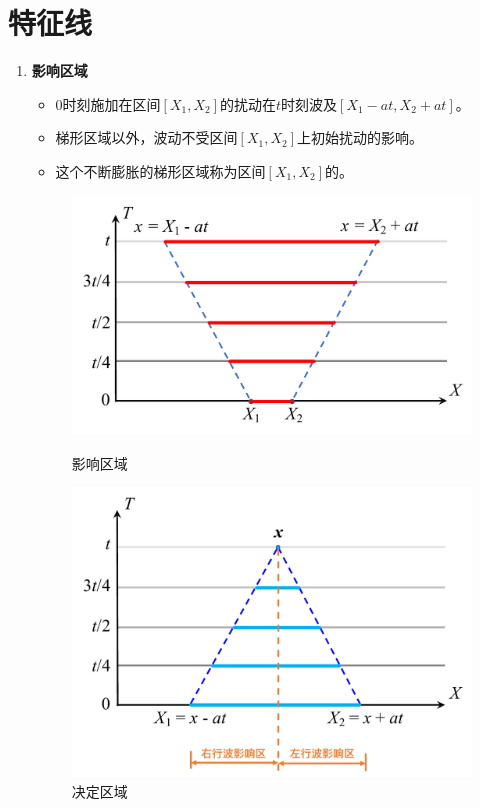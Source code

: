 \section{特征线}
\begin{enumerate}[1. ]
	\item \textbf{影响区域}
		\begin{itemize}
			\item 0时刻施加在区间$[X_1,X_2]$的扰动在$t$时刻波及$[X_1-at, X_2+at]$。
			\item 梯形区域以外，波动不受区间$[X_1,X_2]$上初始扰动的影响。
			\item 这个不断膨胀的梯形区域称为区间$[X_1, X_2]$的。
		\end{itemize}
	\begin{figure}[!htb]
		\begin{minipage}{0.5\linewidth}
			\centering
			\includegraphics[width=0.9\linewidth]{pic/影响区域.pdf}
			\caption{影响区域}
			\label{影响区域}
		\end{minipage}
		\begin{minipage}{0.5\linewidth}
			\centering
			\includegraphics[width=0.85\linewidth]{pic/决定区域.pdf}
			\vspace*{-1.5em}
			\caption{决定区域}
			\label{决定区域}
		\end{minipage}
	\end{figure}
	

\end{enumerate}
